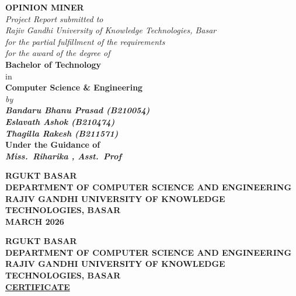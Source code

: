 \documentclass[12pt,a4paper]{report}
\begin{document}
\begin{center}
\vspace*{1.5cm}
{\Large\textbf{OPINION MINER}}\\[1cm]
{\normalsize\textit{Project Report submitted to\\
Rajiv Gandhi University of Knowledge Technologies, Basar\\
for the partial fulfillment of the requirements\\
for the award of the degree of}}\\[0.8cm]
{\large\textbf{Bachelor of Technology}}\\[4pt]
{\normalsize in}\\[4pt]
{\large\textbf{Computer Science \& Engineering}}\\[0.8cm]
{\normalsize\textit{by}}\\[0.5cm]
{\large\textbf{\textit{Bandaru Bhanu Prasad (B210054)\\
Eslavath Ashok (B210474)\\
Thagilla Rakesh (B211571)}}}\\[0.8cm]
{\large\textbf{Under the Guidance of\\
\textit{Miss.\ Riharika , Asst.\ Prof}}}\\[1.5cm]

\begin{figure}[H]
\centering
{}
\end{figure}

\vspace{0.4cm}
{\small\textbf{RGUKT BASAR}}\\[4pt]
{\large\textbf{DEPARTMENT OF COMPUTER SCIENCE AND ENGINEERING\\
RAJIV GANDHI UNIVERSITY OF KNOWLEDGE TECHNOLOGIES, BASAR\\
MARCH 2026}}
\end{center}

\newpage
\setcounter{page}{3}
\thispagestyle{fancy}

\begin{center}
\begin{figure}[H]
\centering
{}
\end{figure}
{\small\textbf{RGUKT BASAR\\
DEPARTMENT OF COMPUTER SCIENCE AND ENGINEERING\\
RAJIV GANDHI UNIVERSITY OF KNOWLEDGE TECHNOLOGIES, BASAR}}\\[1cm]
{\large\textbf{\underline{CERTIFICATE}}}\\[0.8cm]
\end{center}
\end{document}
